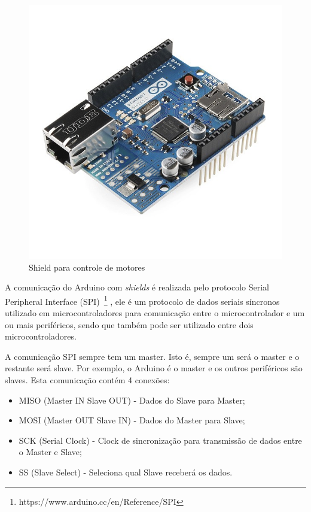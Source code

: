\begin{figure}[ht]
      \centering
      \includegraphics[scale=0.35]{figuras/image_321.jpg}
      \caption{Shield para controle de motores}
      \label{fig:motorControl}
\end{figure}

A comunicação do Arduino com \textit{shields} é realizada pelo protocolo Serial Peripheral Interface (SPI)~\footnote{https://www.arduino.cc/en/Reference/SPI
}  , ele é um protocolo de dados seriais síncronos utilizado em microcontroladores para comunicação entre o microcontrolador e um ou mais periféricos, sendo que também pode ser utilizado entre dois microcontroladores.

A comunicação SPI sempre tem um master. Isto é, sempre um será o master e o restante será slave. Por exemplo, o Arduino é o master e os outros periféricos são slaves. Esta comunicação contém 4 conexões:

\begin{itemize}
  \item MISO (Master IN Slave OUT) - Dados do Slave para Master;
  \item MOSI (Master OUT Slave IN) - Dados do Master para Slave;
  \item SCK (Serial Clock) - Clock de sincronização para transmissão de dados entre o Master e Slave;
  \item SS (Slave Select) - Seleciona qual Slave receberá os dados.
\end{itemize}

